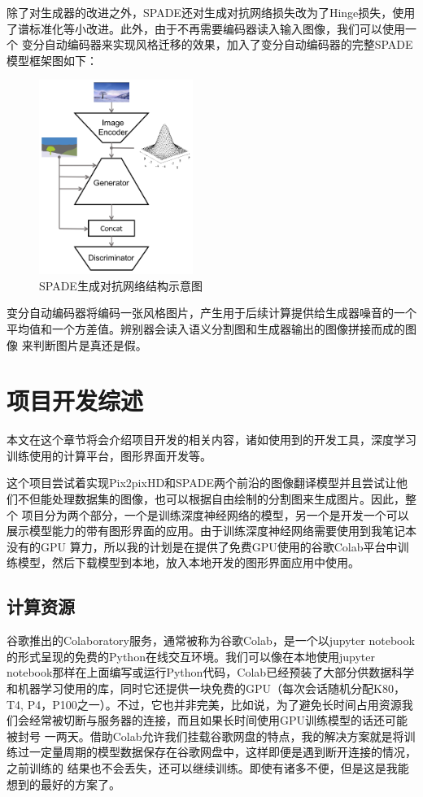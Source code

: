 \documentclass[supercite]{HustGraduPaper}
\theoremstyle{definition}
\begin{document}
除了对生成器的改进之外，SPADE还对生成对抗网络损失改为了Hinge损失，使用了谱标准化等小改进。此外，由于不再需要编码器读入输入图像，我们可以使用一个
变分自动编码器来实现风格迁移的效果，加入了变分自动编码器的完整SPADE模型框架图如下：
\begin{figure}[H]
  \begin{center}
  \includegraphics[width=5cm]{images/SPADE-architecture}
  \end{center}
  \caption{SPADE生成对抗网络结构示意图}
  \label{fig:SPADE-architecture}
\end{figure}

变分自动编码器将编码一张风格图片，产生用于后续计算提供给生成器噪音的一个平均值和一个方差值。辨别器会读入语义分割图和生成器输出的图像拼接而成的图像
来判断图片是真还是假。

\section{项目开发综述}

本文在这个章节将会介绍项目开发的相关内容，诸如使用到的开发工具，深度学习训练使用的计算平台，图形界面开发等。

这个项目尝试着实现Pix2pixHD和SPADE两个前沿的图像翻译模型并且尝试让他们不但能处理数据集的图像，也可以根据自由绘制的分割图来生成图片。因此，整个
项目分为两个部分，一个是训练深度神经网络的模型，另一个是开发一个可以展示模型能力的带有图形界面的应用。由于训练深度神经网络需要使用到我笔记本没有的GPU
算力，所以我的计划是在提供了免费GPU使用的谷歌Colab平台中训练模型，然后下载模型到本地，放入本地开发的图形界面应用中使用。

\subsection{计算资源}

谷歌推出的Colaboratory服务，通常被称为谷歌Colab，是一个以jupyter notebook的形式呈现的免费的Python在线交互环境。我们可以像在本地使用jupyter 
notebook那样在上面编写或运行Python代码，Colab已经预装了大部分供数据科学和机器学习使用的库，同时它还提供一块免费的GPU（每次会话随机分配K80，T4, 
P4，P100之一）。不过，它也并非完美，比如说，为了避免长时间占用资源我们会经常被切断与服务器的连接，而且如果长时间使用GPU训练模型的话还可能被封号
一两天。借助Colab允许我们挂载谷歌网盘的特点，我的解决方案就是将训练过一定量周期的模型数据保存在谷歌网盘中，这样即便是遇到断开连接的情况，之前训练的
结果也不会丢失，还可以继续训练。即使有诸多不便，但是这是我能想到的最好的方案了。
\end{document}
